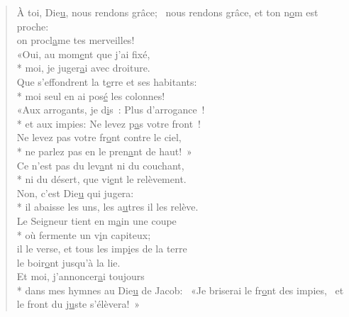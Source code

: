 
\begin{verse}
À toi, Die\underline{u}, nous rendons grâce;~\psalmdagger
nous rendons grâce, et ton n\underline{o}m est proche: \\
on procl\underline{a}me tes merveilles! \\

«Oui, au mom\underline{e}nt que j’ai fixé, \\*
moi, je juger\underline{a}i avec droiture. \\
Que s’effondrent la t\underline{e}rre et ses habitants: \\*
moi seul en ai pos\underline{é} les colonnes! \\

«Aux arrogants, je d\underline{i}s : Plus d’arrogance ! \\*
et aux impies: Ne levez p\underline{a}s votre front ! \\
Ne levez pas votre fr\underline{o}nt contre le ciel, \\*
ne parlez pas en le pren\underline{a}nt de haut! » \\

Ce n’est pas du lev\underline{a}nt ni du couchant, \\*
ni du désert, que vi\underline{e}nt le relèvement. \\
Non, c’est Die\underline{u} qui jugera: \\*
il abaisse les uns, les a\underline{u}tres il les relève. \\

Le Seigneur tient en m\underline{a}in une coupe \\*
où fermente un v\underline{i}n capiteux; \\
il le verse, et tous les imp\underline{i}es de la terre \\
le boir\underline{o}nt jusqu’à la lie. \\

Et moi, j’annoncer\underline{a}i toujours \\*
dans mes hymnes au Die\underline{u} de Jacob:~\psalmdagger
{}«Je briserai le fr\underline{o}nt des impies,~\psalmstar
et le front du j\underline{u}ste s’élèvera! » \\
\end{verse}

